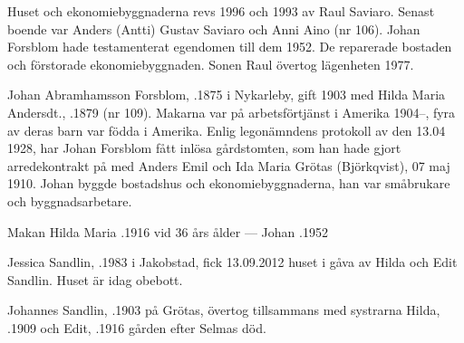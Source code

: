 


Huset och ekonomiebyggnaderna revs 1996 och 1993 av Raul Saviaro. Senast boende var Anders (Antti) Gustav Saviaro och Anni Aino (nr 106). Johan Forsblom hade testamenterat egendomen till dem 1952. De reparerade bostaden och förstorade ekonomiebyggnaden. Sonen Raul övertog lägenheten 1977.


Johan Abramhamsson Forsblom, .1875 i Nykarleby, gift 1903 med Hilda Maria Andersdt., .1879 (nr 109). Makarna var på arbetsförtjänst i Amerika 1904--, fyra av deras barn var födda i Amerika. Enlig legonämndens protokoll av den 13.04 1928, har Johan Forsblom fått inlösa gårdstomten, som han hade gjort arredekontrakt  på  med Anders Emil och Ida Maria Grötas (Björkqvist), 07 maj 1910. Johan byggde bostadshus och ekonomiebyggnaderna, han var småbrukare och byggnadsarbetare.
\begin{jhchildren}
  \item {}
  \item {}
  \item {}
  \item {}
  \item {}
\end{jhchildren}

Makan Hilda Maria .1916 vid 36 års ålder  ---  Johan .1952






Jessica Sandlin, .1983  i Jakobstad, fick 13.09.2012 huset i gåva av Hilda och Edit Sandlin. Huset är idag obebott.\jhvspace{}


Johannes Sandlin, .1903 på Grötas, övertog tillsammans med systrarna Hilda, .1909 och Edit, .1916 gården efter Selmas död.\jhvspace{}


